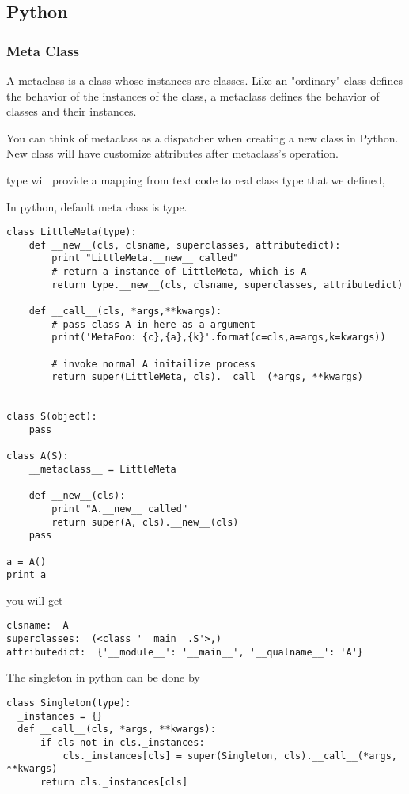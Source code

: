 \subsection{Python}

\subsubsection{Meta Class}
A metaclass is a class whose instances are classes. Like an "ordinary" class defines the behavior of the instances of the class, a metaclass defines the behavior of classes and their instances.

You can think of metaclass as a dispatcher when creating a new class in Python. New class will have customize
attributes after metaclass's operation.

type will provide a mapping from text code to real class type that we defined,

In python, default meta class is type.
\begin{lstlisting}
class LittleMeta(type):
    def __new__(cls, clsname, superclasses, attributedict):
        print "LittleMeta.__new__ called"
        # return a instance of LittleMeta, which is A
        return type.__new__(cls, clsname, superclasses, attributedict)

    def __call__(cls, *args,**kwargs):
        # pass class A in here as a argument
        print('MetaFoo: {c},{a},{k}'.format(c=cls,a=args,k=kwargs))

        # invoke normal A initailize process
        return super(LittleMeta, cls).__call__(*args, **kwargs)


class S(object):
    pass

class A(S):
    __metaclass__ = LittleMeta

    def __new__(cls):
        print "A.__new__ called"
        return super(A, cls).__new__(cls)
    pass

a = A()
print a
\end{lstlisting}

you will get
\begin{lstlisting}
clsname:  A
superclasses:  (<class '__main__.S'>,)
attributedict:  {'__module__': '__main__', '__qualname__': 'A'}
\end{lstlisting}

The singleton in python can be done by
\begin{lstlisting}
class Singleton(type):
  _instances = {}
  def __call__(cls, *args, **kwargs):
      if cls not in cls._instances:
          cls._instances[cls] = super(Singleton, cls).__call__(*args, **kwargs)
      return cls._instances[cls]
\end{lstlisting}


